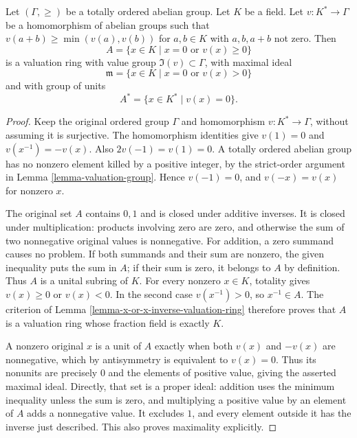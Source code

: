 \begin{lemma}
\label{lemma-valuation-valuation-ring}
Let $(\Gamma, \geq)$ be a totally ordered abelian group.
Let $K$ be a field. Let $v : K^* \to \Gamma$ be a homomorphism
of abelian groups such that $v(a + b) \geq \min(v(a), v(b))$ for
$a, b \in K$ with $a, b, a + b$ not zero. Then
$$
A =
\{
x \in K \mid x = 0 \text{ or } v(x) \geq 0
\}
$$
is a valuation ring with value group $\Im(v) \subset \Gamma$,
with maximal ideal
$$
\mathfrak m =
\{
x \in K \mid x = 0 \text{ or } v(x) > 0
\}
$$
and with group of units
$$
A^* =
\{
x \in K^* \mid v(x) = 0
\}.
$$
\end{lemma}

\begin{proof}
Keep the original ordered group
$\Gamma$ and homomorphism
$v:K^*\to\Gamma$, without
assuming it is surjective.
The homomorphism identities give
$v(1)=0$ and $v(x^{-1})=-v(x)$.
Also $2v(-1)=v(1)=0$.
A totally ordered abelian group
has no nonzero element killed
by a positive integer, by
the strict-order argument in
Lemma \ref{lemma-valuation-group}.
Hence $v(-1)=0$, and
$v(-x)=v(x)$ for nonzero $x$.

The original set $A$ contains
$0,1$ and is closed under
additive inverses. It is
closed under multiplication:
products involving zero are
zero, and otherwise the
sum of two nonnegative
original values is nonnegative.
For addition, a zero summand
causes no problem. If both
summands and their sum are
nonzero, the given inequality
puts the sum in $A$;
if their sum is zero,
it belongs to $A$ by
definition. Thus $A$ is
a unital subring of $K$.
For every nonzero $x\in K$,
totality gives $v(x)\geq0$
or $v(x)<0$. In the
second case $v(x^{-1})>0$,
so $x^{-1}\in A$.
The criterion of Lemma
\ref{lemma-x-or-x-inverse-valuation-ring}
therefore proves that $A$
is a valuation ring whose
fraction field is exactly $K$.

A nonzero original $x$
is a unit of $A$ exactly
when both $v(x)$ and
$-v(x)$ are nonnegative,
which by antisymmetry is
equivalent to $v(x)=0$.
Thus its nonunits are
precisely $0$ and the
elements of positive value,
giving the asserted maximal
ideal. Directly, that set
is a proper ideal: addition
uses the minimum inequality
unless the sum is zero,
and multiplying a positive
value by an element of
$A$ adds a nonnegative
value. It excludes $1$,
and every element outside
it has the inverse just
described. This also proves
maximality explicitly.


\end{proof}
